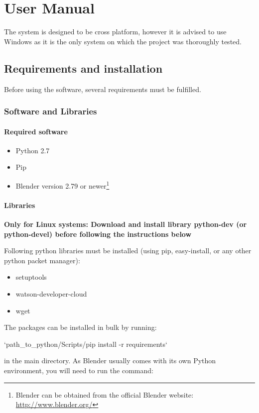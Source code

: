 \chapter{User Manual \label{chap:usermanual}}
The system is designed to be cross platform, however it is advised to use Windows as it is the only system on which the project was thoroughly tested.

\section{Requirements and installation \label{sec:requirements}}
Before using the software, several requirements must be fulfilled.

\subsection{Software and Libraries}
\subsubsection{Required software}
\smallskip
\begin{itemize}
	\item Python 2.7
	\item Pip
	\item Blender version 2.79 or newer\footnote{Blender can be obtained from the official Blender website:  \url{http://www.blender.org/}}
\end{itemize}

\subsubsection{Libraries}
\smallskip
\textbf{Only for Linux systems: Download and install library python-dev (or python-devel) before following the instructions below}

\noindent Following python libraries must be installed (using pip, easy-install, or any other python packet manager):
\begin{itemize}
	\item setuptools
	\item watson-developer-cloud
	\item wget
\end{itemize}
\noindent The packages can be installed in bulk by running:

\indent `path\_to\_python/Scripts/pip install -r requirements`

\noindent in the main directory. As Blender usually comes with its own Python environment, you will need to run the command:

